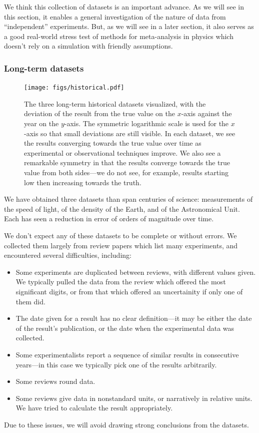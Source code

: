 \documentclass[letterpaper,12pt]{article}
\begin{document}
We think this collection of datasets is an important advance. As we will see in this section, it enables a general investigation of the nature of data from ``independent'' experiments. But, as we will see in a later section, it also serves as a good real-world stress test of methods for meta-analysis in physics which doesn't rely on a simulation with friendly assumptions.

\subsubsection{Long-term datasets}

\begin{figure}[htbp]
  \texttt{[image: figs/historical.pdf]}
  \caption{The three long-term historical datasets visualized, with the deviation of the result from the true value on the $x$-axis against the year on the $y$-axis. The symmetric logarithmic scale is used for the $x$-axis so that small deviations are still visible. In each dataset, we see the results converging towards the true value over time as experimental or observational techniques improve. We also see a remarkable symmetry in that the results converge towards the true value from both sides---we do not see, for example, results starting low then increasing towards the truth.}
  \label{fig:historical}
\end{figure}

We have obtained three datasets than span centuries of science: measurements of the speed of light, of the density of the Earth, and of the Astronomical Unit. Each has seen a reduction in error of orders of magnitude over time.

We don't expect any of these datasets to be complete or without errors. We collected them largely from review papers which list many experiments, and encountered several difficulties, including:
\begin{itemize}
  \item Some experiments are duplicated between reviews, with different values given. We typically pulled the data from the review which offered the most significant digits, or from that which offered an uncertainity if only one of them did.
  \item The date given for a result has no clear definition---it may be either the date of the result's publication, or the date when the experimental data was collected.
  \item Some experimentalists report a sequence of similar results in consecutive years---in this case we typically pick one of the results arbitrarily.
  \item Some reviews round data.
  \item Some reviews give data in nonstandard units, or narratively in relative units. We have tried to calculate the result appropriately.
\end{itemize}
Due to these issues, we will avoid drawing strong conclusions from the datasets.
\end{document}
